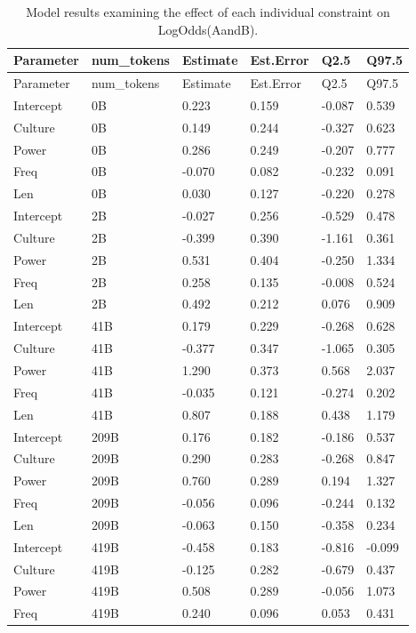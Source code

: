 \documentclass[
  12pt,
  letterpaper,
]{scrreport}
\begin{document}
\begin{longtable}[]{@{}llllll@{}}
\caption{Model results examining the effect of each individual
constraint on LogOdds(AandB).}\tabularnewline
\toprule\noalign{}
Parameter & num\_tokens & Estimate & Est.Error & Q2.5 & Q97.5 \\
\midrule\noalign{}
\endfirsthead
\toprule\noalign{}
Parameter & num\_tokens & Estimate & Est.Error & Q2.5 & Q97.5 \\
\midrule\noalign{}
\endhead
\bottomrule\noalign{}
\endlastfoot
Intercept & 0B & 0.223 & 0.159 & -0.087 & 0.539 \\
Culture & 0B & 0.149 & 0.244 & -0.327 & 0.623 \\
Power & 0B & 0.286 & 0.249 & -0.207 & 0.777 \\
Freq & 0B & -0.070 & 0.082 & -0.232 & 0.091 \\
Len & 0B & 0.030 & 0.127 & -0.220 & 0.278 \\
Intercept & 2B & -0.027 & 0.256 & -0.529 & 0.478 \\
Culture & 2B & -0.399 & 0.390 & -1.161 & 0.361 \\
Power & 2B & 0.531 & 0.404 & -0.250 & 1.334 \\
Freq & 2B & 0.258 & 0.135 & -0.008 & 0.524 \\
Len & 2B & 0.492 & 0.212 & 0.076 & 0.909 \\
Intercept & 41B & 0.179 & 0.229 & -0.268 & 0.628 \\
Culture & 41B & -0.377 & 0.347 & -1.065 & 0.305 \\
Power & 41B & 1.290 & 0.373 & 0.568 & 2.037 \\
Freq & 41B & -0.035 & 0.121 & -0.274 & 0.202 \\
Len & 41B & 0.807 & 0.188 & 0.438 & 1.179 \\
Intercept & 209B & 0.176 & 0.182 & -0.186 & 0.537 \\
Culture & 209B & 0.290 & 0.283 & -0.268 & 0.847 \\
Power & 209B & 0.760 & 0.289 & 0.194 & 1.327 \\
Freq & 209B & -0.056 & 0.096 & -0.244 & 0.132 \\
Len & 209B & -0.063 & 0.150 & -0.358 & 0.234 \\
Intercept & 419B & -0.458 & 0.183 & -0.816 & -0.099 \\
Culture & 419B & -0.125 & 0.282 & -0.679 & 0.437 \\
Power & 419B & 0.508 & 0.289 & -0.056 & 1.073 \\
Freq & 419B & 0.240 & 0.096 & 0.053 & 0.431 \\

\end{longtable}
\end{document}

